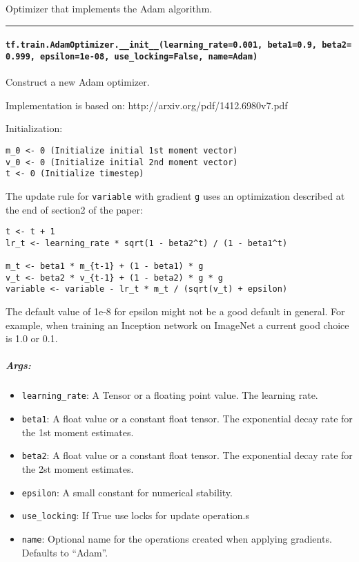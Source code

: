 Optimizer that implements the Adam algorithm.

\begin{center}\rule{0.5\linewidth}{\linethickness}\end{center}

\paragraph{\texorpdfstring{\texttt{tf.train.AdamOptimizer.\_\_init\_\_(learning\_rate=0.001,\ beta1=0.9,\ beta2=0.999,\ epsilon=1e-08,\ use\_locking=False,\ name=\textquotesingle{}Adam\textquotesingle{})}
}{tf.train.AdamOptimizer.\_\_init\_\_(learning\_rate=0.001, beta1=0.9, beta2=0.999, epsilon=1e-08, use\_locking=False, name='Adam') }}\label{tf.train.adamoptimizer.ux5fux5finitux5fux5flearningux5frate0.001-beta10.9-beta20.999-epsilon1e-08-useux5flockingfalse-nameadam}

Construct a new Adam optimizer.

Implementation is based on: http://arxiv.org/pdf/1412.6980v7.pdf

Initialization:

\begin{verbatim}
m_0 <- 0 (Initialize initial 1st moment vector)
v_0 <- 0 (Initialize initial 2nd moment vector)
t <- 0 (Initialize timestep)
\end{verbatim}

The update rule for \texttt{variable} with gradient \texttt{g} uses an
optimization described at the end of section2 of the paper:

\begin{verbatim}
t <- t + 1
lr_t <- learning_rate * sqrt(1 - beta2^t) / (1 - beta1^t)

m_t <- beta1 * m_{t-1} + (1 - beta1) * g
v_t <- beta2 * v_{t-1} + (1 - beta2) * g * g
variable <- variable - lr_t * m_t / (sqrt(v_t) + epsilon)
\end{verbatim}

The default value of 1e-8 for epsilon might not be a good default in
general. For example, when training an Inception network on ImageNet a
current good choice is 1.0 or 0.1.

\subparagraph{Args: }\label{args-8}

\begin{itemize}
\tightlist
\item
  \texttt{learning\_rate}: A Tensor or a floating point value. The
  learning rate.
\item
  \texttt{beta1}: A float value or a constant float tensor. The
  exponential decay rate for the 1st moment estimates.
\item
  \texttt{beta2}: A float value or a constant float tensor. The
  exponential decay rate for the 2st moment estimates.
\item
  \texttt{epsilon}: A small constant for numerical stability.
\item
  \texttt{use\_locking}: If True use locks for update operation.s
\item
  \texttt{name}: Optional name for the operations created when applying
  gradients. Defaults to ``Adam''.
\end{itemize}

